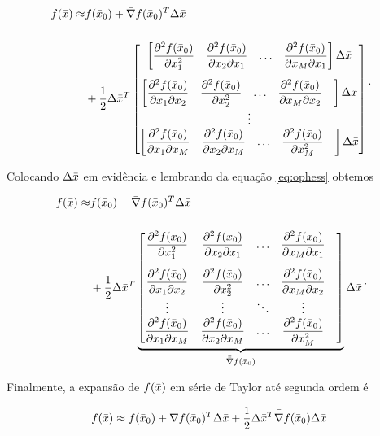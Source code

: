 \begin{equation}
\begin{split}
f(\bar{x}) \approx
&f(\bar{x}_0) + \bar{\nabla}f(\bar{x}_0)^T\Delta\bar{x}\
\\[0.5cm]
&+ \dfrac{1}{2}\Delta\bar{x}^T
\begin{bmatrix}
    \begin{bmatrix}
    \dfrac{\partial^2 f(\bar{x}_0)}{\partial x_1^2} &
    \dfrac{\partial^2 f(\bar{x}_0)}{\partial x_2\partial x_1} &
    \ldots &
    \dfrac{\partial^2 f(\bar{x}_0)}{\partial x_M\partial x_1}
    \end{bmatrix}
    \Delta\bar{x}
    \\[0.5cm]
    \begin{bmatrix}
    \dfrac{\partial^2 f(\bar{x}_0)}{\partial x_1\partial x_2} &
    \dfrac{\partial^2 f(\bar{x}_0)}{\partial x_2^2} &
    \ldots &
    \dfrac{\partial^2 f(\bar{x}_0)}{\partial x_M\partial x_2} &
    \end{bmatrix}
    \Delta\bar{x}
    \\
    \vdots
    \\
    \begin{bmatrix}
    \dfrac{\partial^2 f(\bar{x}_0)}{\partial x_1\partial x_M} &
    \dfrac{\partial^2 f(\bar{x}_0)}{\partial x_2\partial x_M} &
    \ldots &
    \dfrac{\partial^2 f(\bar{x}_0)}{\partial x_M^2} &
    \end{bmatrix}
    \Delta\bar{x}
\end{bmatrix}
\end{split}
\thinspace .
\end{equation}

\noindent Colocando $\Delta\bar{x}$ em evidência e lembrando da equação
\ref{eq:ophess} obtemos

\begin{equation}
\begin{split}
f(\bar{x}) \approx
&f(\bar{x}_0) + \bar{\nabla}f(\bar{x}_0)^T\Delta\bar{x}\
\\[0.5cm]
&+ \dfrac{1}{2}\Delta\bar{x}^T
\underbrace{
\begin{bmatrix}
    \dfrac{\partial^2 f(\bar{x}_0)}{\partial x_1^2} &
    \dfrac{\partial^2 f(\bar{x}_0)}{\partial x_2\partial x_1} &
    \ldots &
    \dfrac{\partial^2 f(\bar{x}_0)}{\partial x_M\partial x_1}
    \\[0.5cm]
    \dfrac{\partial^2 f(\bar{x}_0)}{\partial x_1\partial x_2} &
    \dfrac{\partial^2 f(\bar{x}_0)}{\partial x_2^2} &
    \ldots &
    \dfrac{\partial^2 f(\bar{x}_0)}{\partial x_M\partial x_2} &
    \\
    \vdots & \vdots & \ddots & \vdots
    \\
    \dfrac{\partial^2 f(\bar{x}_0)}{\partial x_1\partial x_M} &
    \dfrac{\partial^2 f(\bar{x}_0)}{\partial x_2\partial x_M} &
    \ldots &
    \dfrac{\partial^2 f(\bar{x}_0)}{\partial x_M^2} &
\end{bmatrix}}_{\bar{\bar{\nabla}}f(\bar{x}_0)}
\Delta\bar{x}
\end{split}
\thinspace .
\end{equation}

\noindent Finalmente, a expansão de $f(\bar{x})$ em série de Taylor até
segunda ordem é

\begin{equation}
f(\bar{x}) \approx
    f(\bar{x}_0) +
    \bar{\nabla}f(\bar{x}_0)^T\Delta\bar{x} +
    \dfrac{1}{2}\Delta\bar{x}^T\bar{\bar{\nabla}}f(\bar{x}_0)\Delta\bar{x}
\thinspace .
\end{equation}
